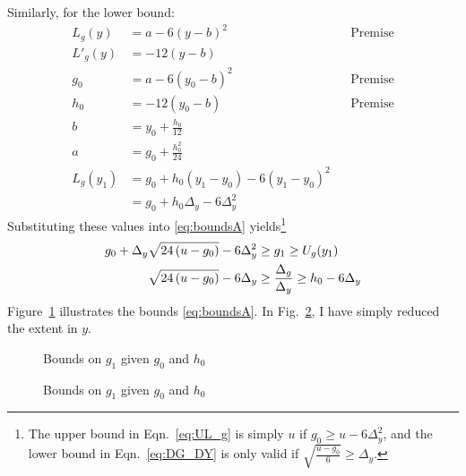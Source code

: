 \documentclass[]{article}
\begin{document}
Similarly, for the lower bound:
\newcommand{\LgQ}{g_0 + h_0\Delta_y - 6\Delta_y^2}
\begin{align*}
  L_g(y) &= a - 6(y-b)^2 &&\text{Premise} \nonumber \\
  L'_g(y) &= -12(y-b) \nonumber \\
  g_0 &= a - 6(y_0-b)^2 &&\text{Premise} \nonumber \\
  h_0 &= -12(y_0-b) &&\text{Premise} \nonumber \\
  b &= y_0 + \frac{h_0}{12} \nonumber \\
  a &= g_0 + \frac{h^2_0}{24} \\
  L_g(y_1) &= g_0 + h_0(y_1-y_0) -6(y_1-y_0)^2 \nonumber
  \\
  &= \LgQ \nonumber
\end{align*}
Substituting these values into \eqref{eq:boundsA} yields\footnote{The
  upper bound in Eqn.\ \eqref{eq:UL_g} is simply $u$ if $g_0 \geq u -
  6 \Delta_y^2$, and the lower bound in Eqn.\ \eqref{eq:DG_DY} is only
  valid if $\sqrt{\frac{u-g_0}{6}} \geq \Delta_y$.}
\begin{align}
  \label{eq:UL_g}
  g_0 + \Delta_y\sqrt{24\left(u-g_0\right)} - 6 \Delta_y^2 &\geq g_1 \geq U_g(y_1) \\
  \label{eq:DG_DY}
  \sqrt{24\left(u-g_0\right)} - 6\Delta_y &\geq \frac{\Delta_g}{\Delta_y} \geq h_0
  - 6 \Delta_y
\end{align}
Figure~\ref{fig:boundsA} illustrates the bounds
\eqref{eq:boundsA}.  In Fig.~\ref{fig:boundsB}, I have simply reduced
the extent in $y$.

\begin{figure}
  \centering
  \caption{Bounds on $g_1$ given $g_0$ and $h_0$}
  \label{fig:boundsA}
\end{figure}
\begin{figure}
  \centering
  \caption{Bounds on $g_1$ given $g_0$ and $h_0$}
  \label{fig:boundsB}
\end{figure}
\end{document}
